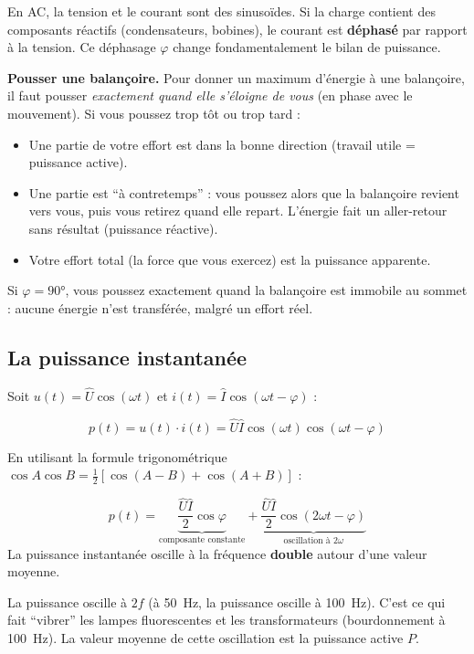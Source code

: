 \documentclass[12pt,a4paper,twoside]{book}
\begin{document}
En AC, la tension et le courant sont des sinusoïdes. Si la charge contient des composants réactifs (condensateurs, bobines), le courant est \textbf{déphasé} par rapport à la tension. Ce déphasage $\varphi$ change fondamentalement le bilan de puissance.

\begin{analogie}
\textbf{Pousser une balançoire.} Pour donner un maximum d'énergie à une balançoire, il faut pousser \textit{exactement quand elle s'éloigne de vous} (en phase avec le mouvement). Si vous poussez trop tôt ou trop tard :
\begin{itemize}[nosep]
\item Une partie de votre effort est dans la bonne direction (travail utile = puissance active).
\item Une partie est ``à contretemps'' : vous poussez alors que la balançoire revient vers vous, puis vous retirez quand elle repart. L'énergie fait un aller-retour sans résultat (puissance réactive).
\item Votre effort total (la force que vous exercez) est la puissance apparente.
\end{itemize}
Si $\varphi = 90°$, vous poussez exactement quand la balançoire est immobile au sommet : aucune énergie n'est transférée, malgré un effort réel.
\end{analogie}

\subsection{La puissance instantanée}

Soit $u(t) = \hat{U}\cos(\omega t)$ et $i(t) = \hat{I}\cos(\omega t - \varphi)$ :

\[
p(t) = u(t) \cdot i(t) = \hat{U}\hat{I}\cos(\omega t)\cos(\omega t - \varphi)
\]

En utilisant la formule trigonométrique $\cos A\cos B = \frac{1}{2}[\cos(A-B)+\cos(A+B)]$ :

\begin{formule}
\[
\boxed{p(t) = \underbrace{\frac{\hat{U}\hat{I}}{2}\cos\varphi}_{\text{composante constante}} + \underbrace{\frac{\hat{U}\hat{I}}{2}\cos(2\omega t - \varphi)}_{\text{oscillation à } 2\omega}}
\]
La puissance instantanée oscille à la fréquence \textbf{double} autour d'une valeur moyenne.
\end{formule}

\begin{intuition}
La puissance oscille à $2f$ (à \SI{50}{Hz}, la puissance oscille à \SI{100}{Hz}). C'est ce qui fait ``vibrer'' les lampes fluorescentes et les transformateurs (bourdonnement à \SI{100}{Hz}). La valeur moyenne de cette oscillation est la puissance active $P$.
\end{intuition}
\end{document}
